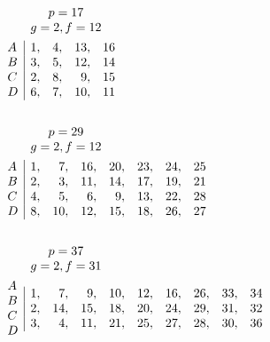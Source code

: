 \documentclass{book}
\theoremstyle{plain}
\theoremstyle{remark}
\begin{document}
\begin{align*}
& \begin{array}{c} p=17 \\  g=2, f=12 \end{array} \\
\begin{array}{l} A \\ B \\ C \\D \end{array} & 
\begin{array}{|rrrr} 
1,& 4,&13,& 16 \\ 
3,& 5,&12,&14 \\
2,& 8,& 9,&15 \\ 
6,& 7,&10,&11 
\end{array} \\
\hspace{1mm} \\
& \begin{array}{c} p=29 \\  g=2, f=12 \end{array} \\
\begin{array}{l} A \\ B \\ C \\D \end{array} & 
\begin{array}{|rrrrrrr} 1,&7,&16,&20,&23,&24,&25\\ 
2,& 3,&11,&14,&17,&19,&21 \\ 
4,& 5,&6,&9,&13,&22,&28 \\ 
8,& 10,& 12,&15,&18,& 26,&27
\end{array} \\
\hspace{1mm} \\
& \begin{array}{c} p=37 \\  g=2, f=31 \end{array} \\
\begin{array}{l} A \\ B \\ C \\D \end{array} & 
\begin{array}{|rrrrrrrrr} 
1,&7,&9,&10,&12,&16,&26,&33,&34 \\ 
2,& 14,&15,&18,&20,&24,&29,&31,&32 \\ 
3,& 4,& 11,&21,&25,&27,&28,&30,&36 \\ 

\end{array}
\end{align*}
\end{document}
